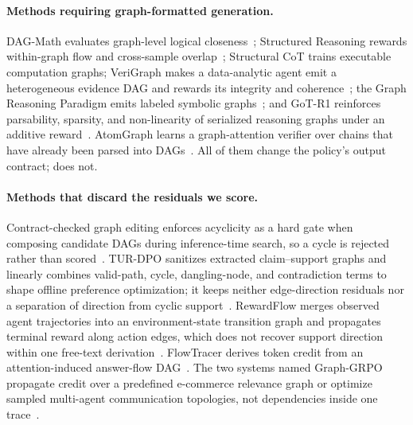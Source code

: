 \paragraph{Methods requiring graph-formatted generation.}
DAG-Math evaluates graph-level logical closeness~\citep{zhang2026dagmath}; Structured Reasoning
rewards within-graph flow and cross-sample overlap~\citep{dong2026structured}; Structural CoT
trains executable computation graphs; VeriGraph makes a
data-analytic agent emit a heterogeneous evidence DAG and rewards its integrity and
coherence~\citep{jin2026verigraph}; the Graph Reasoning Paradigm emits labeled symbolic
graphs~\citep{liu2026graph}; and GoT-R1 reinforces parsability, sparsity, and non-linearity of
serialized reasoning graphs under an additive reward~\citep{li2026gotr1}. AtomGraph learns a
graph-attention verifier over chains that have already been parsed into DAGs~\citep{karmore2026atomgraph}.
All of them change the policy's output contract; \method does not.

\paragraph{Methods that discard the residuals we score.}
Contract-checked graph editing enforces acyclicity as a hard gate when composing candidate DAGs
during inference-time search, so a cycle is rejected rather than scored~\citep{li2026contract}.
TUR-DPO sanitizes extracted claim--support graphs and linearly combines valid-path, cycle,
dangling-node, and contradiction terms to shape offline preference optimization; it keeps neither
edge-direction residuals nor a separation of direction from cyclic support~\citep{abdullah2026turdpo}.
RewardFlow merges observed agent trajectories into an environment-state transition graph and
propagates terminal reward along action edges, which does not recover support direction within one
free-text derivation~\citep{feng2026rewardflow}. FlowTracer derives token credit from an
attention-induced answer-flow DAG~\citep{dong2026flowtracer}. The two systems named Graph-GRPO
propagate credit over a predefined e-commerce relevance graph or optimize sampled multi-agent
communication topologies, not dependencies inside one trace~\citep{che2026graphgrpo,cang2026graphgrpo}.

